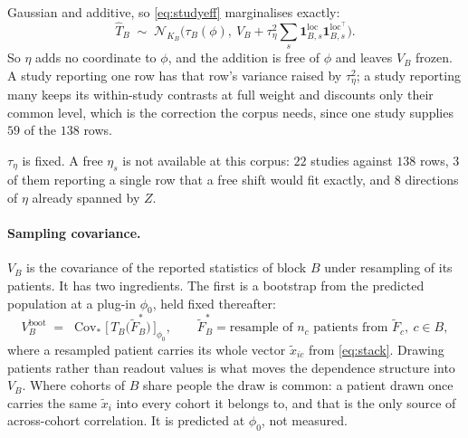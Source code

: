 \documentclass[11pt]{article}
\newcommand{\Ncal}{\mathcal{N}}
\newcommand{\Tr}{^{\!\top}}
\DeclareMathOperator*{\Cov}{Cov}
\begin{document}
Gaussian and additive, so \eqref{eq:studyeff} marginalises exactly:
\begin{equation}
\widehat T_B \;\sim\; \Ncal_{K_B}\Big(\tau_B(\phi),\
  V_B + \tau_\eta^2 \textstyle\sum_s
  \mathbf{1}^{\mathrm{loc}}_{B,s}\mathbf{1}^{\mathrm{loc}\Tr}_{B,s}\Big).
\label{eq:studymarg}
\end{equation}
So $\eta$ adds no coordinate to $\phi$, and the addition is free of $\phi$ and
leaves $V_B$ frozen. A study reporting one row has that row's variance raised by
$\tau_\eta^2$; a study reporting many keeps its within-study contrasts at full
weight and discounts only their common level, which is the correction the corpus
needs, since one study supplies $59$ of the $138$ rows.

$\tau_\eta$ is fixed. A free $\eta_s$ is not available at this corpus: $22$
studies against $138$ rows, $3$ of them reporting a single row that a free shift
would fit exactly, and $8$ directions of $\eta$ already spanned by $Z$.

\paragraph{Sampling covariance.} $V_{B}$ is the covariance of the reported
statistics of block $B$ under resampling of its patients. It has two
ingredients. The first is a bootstrap from the predicted population at a plug-in
$\phi_0$, held fixed thereafter:
\begin{equation}
V^{\text{boot}}_{B}
\;=\;
\Cov_{\ast}\!\Big[\,T_{B}\big(\tilde F^{\ast}_{B}\big)\,\Big]_{\phi_0},
\qquad
\tilde F^{\ast}_{B}
= \text{resample of } n_c \text{ patients from } \tilde F_{c}, \ c\in B,
\label{eq:V}
\end{equation}
where a resampled patient carries its whole vector $\tilde x_{ic}$ from
\eqref{eq:stack}. Drawing patients rather than readout values is what moves the
dependence structure into $V_B$. Where cohorts of $B$ share people the draw is
common: a patient drawn once carries the same $\tilde x_i$ into every cohort it
belongs to, and that is the only source of across-cohort correlation. It is
predicted at $\phi_0$, not measured.
\end{document}
